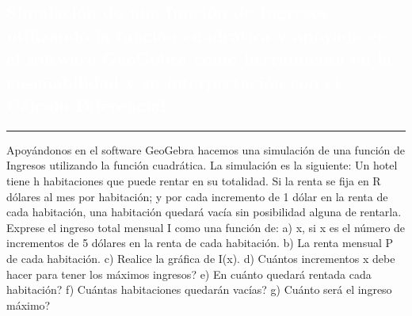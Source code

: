 \begin{titlepage}
\pagecolor{white}
\newcommand{\R}{\ensuremath{\mathbb{R}}}
\BgThispage
{}
\vspace*{-1.1cm}
\noindent
\def\titulo#1{\section{#1}}

\section{\bf\large\textcolor{white}{Simulaci\'on de una funci\'on de Ingresos utilizando la funci\'on cuadr\'atica y apoyada en el software GeoGebra como herramienta en la ense\~nabilidad y su interpretaci\'on con el C\'alculo Diferencial}}
\vspace*{2cm}\par
\noindent

\begin{minipage}{0.5\linewidth}
\begin{minipage}{0.45\linewidth}
    \begin{flushright}
        \printauthor
    \end{flushright}
\end{minipage} \hspace{-3pt}
%
\begin{minipage}{0.02\linewidth}
   \color{ptctitle} \rule{1pt}{245pt}
\end{minipage} 
\end{minipage}
\hspace*{-4.5cm}
\begin{minipage}{0.85\linewidth}
\begin{minipage}{0.85\linewidth}
\footnotesize
\vspace{5pt}
    \begin{resumen}
    Apoy\'andonos en el software GeoGebra  hacemos una simulaci\'on de una funci\'on de Ingresos utilizando la funci\'on cuadr\'atica. La simulaci\'on es la siguiente: Un hotel tiene h habitaciones que puede rentar en su totalidad. Si la renta se fija en R d\'olares al mes por habitaci\'on; y por cada incremento de 1 d\'olar en la renta de cada habitaci\'on, una habitaci\'on quedar\'a vac\'ia sin posibilidad alguna de rentarla. Exprese el ingreso total mensual I como una funci\'on de: a) x, si x es el n\'umero de incrementos de 5 d\'olares en la renta de cada habitaci\'on.    b) La renta mensual P de cada habitaci\'on. c) Realice la gr\'afica de I(x). d) \textquestiondown Cu\'antos incrementos x debe hacer para tener los m\'aximos ingresos?  e) \textquestiondown En  cu\'anto quedar\'a rentada cada habitaci\'on? f) \textquestiondown Cu\'antas habitaciones quedar\'an vac\'ias? g) \textquestiondown Cu\'anto ser\'a el ingreso m\'aximo?


\end{resumen}
\end{minipage}
\end{minipage}
\end{titlepage}
